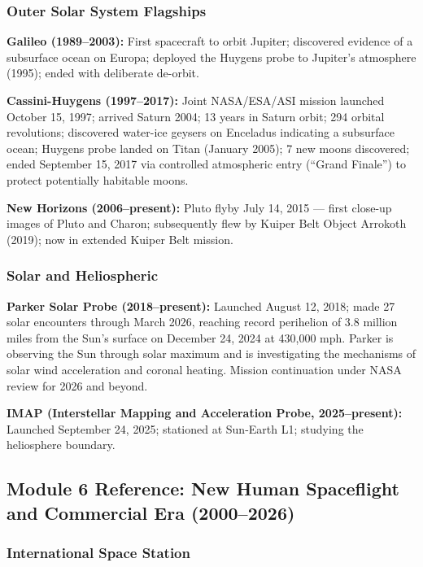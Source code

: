 \documentclass[11pt,letterpaper]{article}
\begin{document}
\subsubsection{Outer Solar System Flagships}

\textbf{Galileo (1989--2003):} First spacecraft to orbit Jupiter; discovered evidence of a subsurface ocean on Europa; deployed the Huygens probe to Jupiter's atmosphere (1995); ended with deliberate de-orbit.

\textbf{Cassini-Huygens (1997--2017):} Joint NASA/ESA/ASI mission launched October 15, 1997; arrived Saturn 2004; 13 years in Saturn orbit; 294 orbital revolutions; discovered water-ice geysers on Enceladus indicating a subsurface ocean; Huygens probe landed on Titan (January 2005); 7 new moons discovered; ended September 15, 2017 via controlled atmospheric entry (``Grand Finale'') to protect potentially habitable moons.

\textbf{New Horizons (2006--present):} Pluto flyby July 14, 2015 --- first close-up images of Pluto and Charon; subsequently flew by Kuiper Belt Object Arrokoth (2019); now in extended Kuiper Belt mission.

\subsubsection{Solar and Heliospheric}

\textbf{Parker Solar Probe (2018--present):} Launched August 12, 2018; made 27 solar encounters through March 2026, reaching record perihelion of 3.8 million miles from the Sun's surface on December 24, 2024 at 430,000 mph. Parker is observing the Sun through solar maximum and is investigating the mechanisms of solar wind acceleration and coronal heating. Mission continuation under NASA review for 2026 and beyond.

\textbf{IMAP (Interstellar Mapping and Acceleration Probe, 2025--present):} Launched September 24, 2025; stationed at Sun-Earth L1; studying the heliosphere boundary.

\subsection{Module 6 Reference: New Human Spaceflight and Commercial Era (2000--2026)}

\subsubsection{International Space Station}
\end{document}
